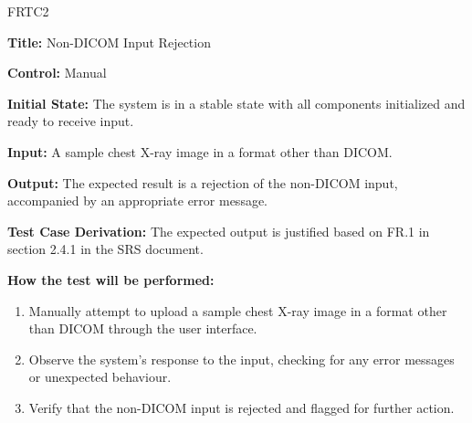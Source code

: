 \documentclass[12pt, titlepage]{article}
\begin{document}
\begin{itemize}
    \begin{item}
        FRTC2
        \begin{mdframed}[linewidth=0.5mm]
            \textbf{Title:} Non-DICOM Input Rejection \par
            \textbf{Control:} Manual \par
            \textbf{Initial State:} The system is in a stable state with all components initialized and ready to receive input. \par
            \textbf{Input:} A sample chest X-ray image in a format other than DICOM. \par
            \textbf{Output:} The expected result is a rejection of the non-DICOM input, accompanied by an appropriate error message. \par
            \textbf{Test Case Derivation:} The expected output is justified based on FR.1 in section 2.4.1 in the SRS document. \par
            \textbf{How the test will be performed:}
            \begin{enumerate}[noitemsep]
                \item Manually attempt to upload a sample chest X-ray image in a format other than DICOM through the user interface.
                \item Observe the system's response to the input, checking for any error messages or unexpected behaviour.
                \item Verify that the non-DICOM input is rejected and flagged for further action.
            \end{enumerate}
        \end{mdframed}
    \end{item}


\end{itemize}
\end{document}
